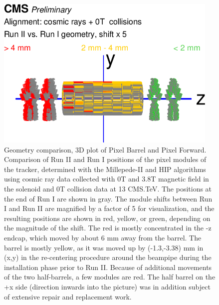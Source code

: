\begin{figure}[htb] 
    \begin{center}
        \includegraphics[width=0.95\textwidth]{../figs/Alignment/AlRes_RunIIvsRunI.png}
    \end{center}
    \caption{Geometry comparison, 3D plot of Pixel Barrel and Pixel Forward. Comparison of Run II and Run I positions of the pixel modules of the tracker, determined with the Millepede-II and HIP algorithms using cosmic ray data collected with 0T and 3.8T magnetic field in the solenoid and 0T collision data at 13 CMS.TeV. The positions at the end of Run I are shown in gray. The module shifts between Run I and Run II are magnified by a factor of 5 for visualization, and the resulting positions are shown in red, yellow, or green, depending on the magnitude of the shift. The red is mostly concentrated in the -z endcap, which moved by about 6 mm away from the barrel. The barrel is mostly yellow, as it was moved up by (-1.3,-3.38) mm in (x,y) in the re-centering procedure around the beampipe during the installation phase prior to Run II. Because of additional movements of the two half-barrels, a few modules are red. The half barrel on the +x side (direction inwards into the picture) was in addition subject of extensive repair and replacement work. }
    \label{fig:GCP_3D}
\end{figure}

